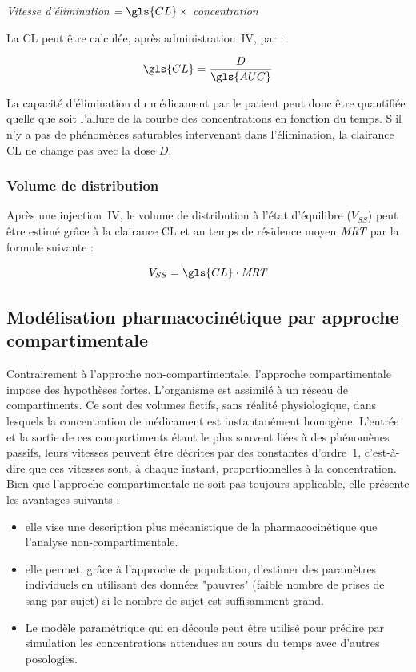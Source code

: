 \begin{center}
\textit{Vitesse d'élimination = $\gls{CL} \, \times$ concentration}
\end{center}

La \gls{CL} peut être calculée, après administration~\gls{IV}, par :

\begin{equation}
\gls{CL} = \frac{D}{\gls{AUC}}
\label{eq:11}
\end{equation}

La capacité d'élimination du médicament par le patient peut donc être quantifiée quelle que soit l'allure de la courbe des concentrations en fonction du temps. S'il n'y a pas de phénomènes saturables intervenant dans l'élimination, la clairance \gls{CL} ne change pas avec la dose $D$.

\subsubsection{Volume de distribution}
Après une injection~\gls{IV}, le volume de distribution à l'état d'équilibre ($V_{SS}$) peut être estimé grâce à la clairance \gls{CL} et au temps de résidence moyen $\operatorname{\textit{MRT}}$ par la formule suivante :

\begin{equation}
V_{SS} = \gls{CL} \cdot \MRT
\label{eq:12}
\end{equation}

\subsection{Modélisation pharmacocinétique par approche compartimentale}
Contrairement à l'approche non-compartimentale, l'approche compartimentale impose des hypothèses fortes. L'organisme est assimilé à un réseau de compartiments. Ce sont des volumes fictifs, sans réalité physiologique, dans lesquels la concentration de médicament est instantanément homogène. L'entrée et la sortie de ces compartiments étant le plus souvent liées à des phénomènes passifs, leurs vitesses peuvent être décrites par des constantes d'ordre~1, c'est-à-dire que ces vitesses sont, à chaque instant, proportionnelles à la concentration. Bien que l'approche compartimentale ne soit pas toujours applicable, elle présente les avantages suivants :
\begin{itemize}
\item elle vise une description plus mécanistique de la pharmacocinétique que l'analyse non-compartimentale.

\item elle permet, grâce à l'approche de population, d'estimer des paramètres individuels en utilisant des données "pauvres" (faible nombre de prises de sang par sujet) si le nombre de sujet est suffisamment grand.

\item Le modèle paramétrique qui en découle peut être utilisé pour prédire par simulation les concentrations attendues au cours du temps avec d'autres posologies.
\end{itemize}

